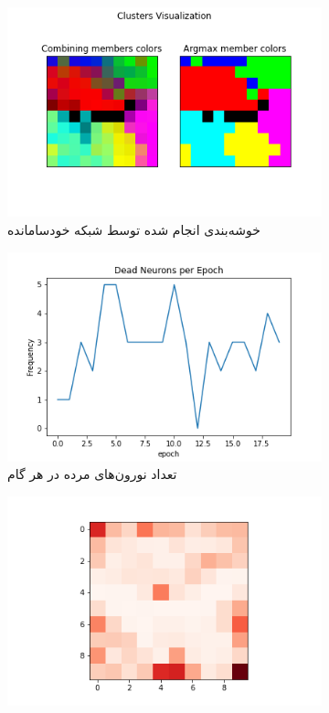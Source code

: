 \documentclass[12pt, a4paper]{article}
\begin{document}
\clearpage

\begin{figure}[h]
    \begin{subfigure}{\linewidth}
        \centering
        \includegraphics[width=0.8\linewidth]{images/q5/r11/cluster.png}
        \caption{خوشه‌بندی انجام شده توسط شبکه خودسامانده}
    \end{subfigure}
    \newline
    \begin{subfigure}{0.45\linewidth}
        \includegraphics[width=\linewidth]{images/q5/r11/dead.png}
        \caption{تعداد نورون‌های مرده در هر گام}
    \end{subfigure}
    \hfill
    \begin{subfigure}{0.45\linewidth}
        \includegraphics[width=\linewidth]{images/q5/r11/umatrix.png}

\end{subfigure}
\end{figure}
\end{document}
